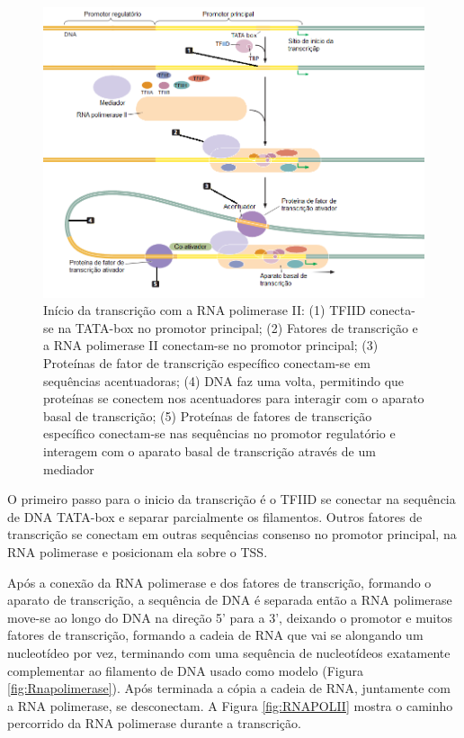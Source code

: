 \begin{figure}[H]
    \centering
    \includegraphics[scale=0.7]{./figuras/iniciacao_trans.png}
    \caption{ Início da transcrição com a RNA polimerase II: (1) TFIID conecta-se na TATA-box no promotor principal; (2) Fatores de transcrição e a RNA polimerase II conectam-se no promotor principal; (3) Proteínas de fator de transcrição específico conectam-se em sequências acentuadoras; (4) DNA faz uma volta, permitindo que proteínas se conectem nos acentuadores para interagir com o aparato basal de transcrição; (5) Proteínas de fatores de transcrição específico conectam-se nas sequências no promotor regulatório e interagem com o aparato basal de transcrição através de um mediador \cite[Adaptada]{Pierce2012}}
    \label{fig:iniciacao_trans}
\end{figure}

O primeiro passo para o inicio da transcrição é o TFIID se conectar na sequência de DNA TATA-box e separar parcialmente os filamentos. Outros fatores de transcrição se conectam em outras sequências consenso no promotor principal, na RNA polimerase e posicionam ela sobre o TSS.

Após a conexão da RNA polimerase e dos fatores de transcrição, formando o aparato de transcrição, a sequência de DNA é separada então a RNA polimerase move-se ao longo do DNA na direção 5' para a 3', deixando o promotor e muitos fatores de transcrição, formando a cadeia de RNA que vai se alongando um nucleotídeo por vez, terminando com uma sequência de nucleotídeos exatamente complementar ao filamento de DNA usado como modelo (Figura \ref{fig:Rnapolimerase}).  Após terminada a cópia a cadeia de RNA, juntamente com a RNA polimerase, se desconectam. A Figura \ref{fig:RNAPOLII} mostra o caminho percorrido da RNA polimerase durante a transcrição.

